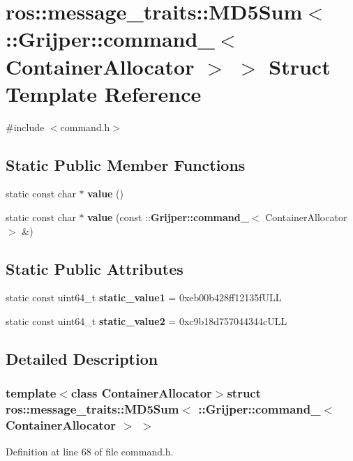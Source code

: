 \section{ros\-:\-:message\-\_\-traits\-:\-:M\-D5\-Sum$<$ \-:\-:Grijper\-:\-:command\-\_\-$<$ Container\-Allocator $>$ $>$ Struct Template Reference}
\label{structros_1_1message__traits_1_1MD5Sum_3_01_1_1Grijper_1_1command___3_01ContainerAllocator_01_4_01_4}


{\ttfamily \#include $<$command.\-h$>$}

\subsection*{Static Public Member Functions}
\begin{DoxyCompactItemize}
\item 
static const char $\ast$ {\bf value} ()
\item 
static const char $\ast$ {\bf value} (const \-::{\bf Grijper\-::command\-\_\-}$<$ Container\-Allocator $>$ \&)
\end{DoxyCompactItemize}
\subsection*{Static Public Attributes}
\begin{DoxyCompactItemize}
\item 
static const uint64\-\_\-t {\bf static\-\_\-value1} = 0xeb00b428ff12135f\-U\-L\-L
\item 
static const uint64\-\_\-t {\bf static\-\_\-value2} = 0xc9b18d757044344c\-U\-L\-L
\end{DoxyCompactItemize}


\subsection{Detailed Description}
\subsubsection*{template$<$class Container\-Allocator$>$struct ros\-::message\-\_\-traits\-::\-M\-D5\-Sum$<$ \-::\-Grijper\-::command\-\_\-$<$ Container\-Allocator $>$ $>$}



Definition at line 68 of file command.\-h.



